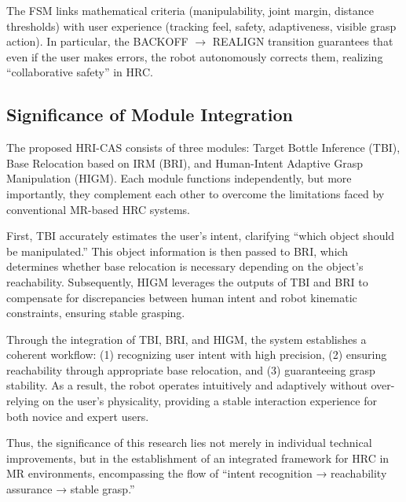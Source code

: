 \documentclass[../../main.tex]{subfiles} %
\begin{document}
The FSM links mathematical criteria (manipulability, joint margin, distance thresholds) with 
user experience (tracking feel, safety, adaptiveness, visible grasp action).  
In particular, the BACKOFF $\to$ REALIGN transition guarantees that even if the user makes errors, 
the robot autonomously corrects them, realizing “collaborative safety” in HRC.


\subsection{Significance of Module Integration}

The proposed HRI-CAS consists of three modules: Target Bottle Inference (TBI), 
Base Relocation based on IRM (BRI), 
and Human-Intent Adaptive Grasp Manipulation (HIGM).  
Each module functions independently, but more importantly, 
they complement each other to overcome 
the limitations faced by conventional MR-based HRC systems.

First, TBI accurately estimates the user’s intent, clarifying “which object should be manipulated.”  
This object information is then passed to BRI, which determines whether base relocation is necessary 
depending on the object’s reachability.  
Subsequently, HIGM leverages the outputs of TBI and BRI to compensate for discrepancies between human 
intent and robot kinematic constraints, ensuring stable grasping.

Through the integration of TBI, BRI, and HIGM, the system establishes a coherent workflow:  
(1) recognizing user intent with high precision,  
(2) ensuring reachability through appropriate base relocation, and  
(3) guaranteeing grasp stability.  
As a result, the robot operates intuitively and adaptively without over-relying on the user’s physicality, 
providing a stable interaction experience for both novice and expert users.

Thus, the significance of this research lies not merely in individual technical improvements, but in the establishment 
of an integrated framework for HRC in MR environments, encompassing the flow of 
“intent recognition → reachability assurance → stable grasp.”
\end{document}
